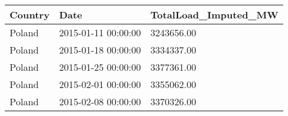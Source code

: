 \begin{tabular}{lll}
\toprule
Country & Date & TotalLoad\_Imputed\_MW \\
\midrule
Poland & 2015-01-11 00:00:00 & 3243656.00 \\
Poland & 2015-01-18 00:00:00 & 3334337.00 \\
Poland & 2015-01-25 00:00:00 & 3377361.00 \\
Poland & 2015-02-01 00:00:00 & 3355062.00 \\
Poland & 2015-02-08 00:00:00 & 3370326.00 \\
\bottomrule
\end{tabular}
